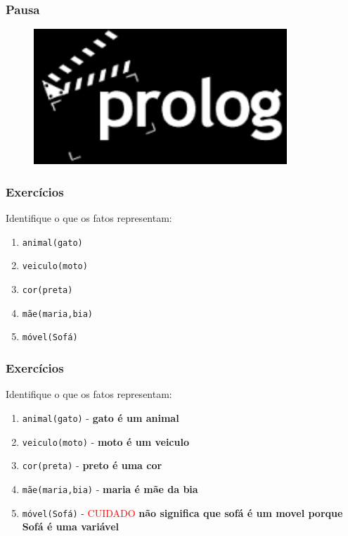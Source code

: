 \documentclass[sans]{beamer}
\begin{document}
\begin{frame}[fragile]   %
\frametitle{Pausa}

\begin{figure}[!htb]
\centering
\includegraphics[width=0.85\textwidth , height=0.65\textheight]{figuras/the_end_video.png}
\end{figure}

\end{frame}

\begin{frame}[fragile]   %
\frametitle{Exercícios}
\begin{block}{Identifique o que os fatos representam:}

\begin{enumerate}

\item \texttt{animal(gato)}
\item \texttt{veiculo(moto)}
\item \texttt{cor(preta)}
\item \texttt{mãe(maria,bia)}
\item \texttt{móvel(Sofá)}

\end{enumerate}
\end{block}   
\end{frame}

\begin{frame}[fragile]   %
\frametitle{Exercícios}
\begin{block}{Identifique o que os fatos representam:}

\begin{enumerate}

\item \texttt{animal(gato)} - {\bf gato é um animal}
\item \texttt{veiculo(moto)} - {\bf moto é um veiculo}
\item \texttt{cor(preta)} - {\bf preto é uma cor}
\item \texttt{mãe(maria,bia)} - {\bf maria é mãe da bia}
\item \texttt{móvel(Sofá)} -  \textcolor{red}{CUIDADO} {\bf não significa que sofá é um movel porque Sofá é uma variável}


\end{enumerate}
\end{block}   
\end{frame}
\end{document}
